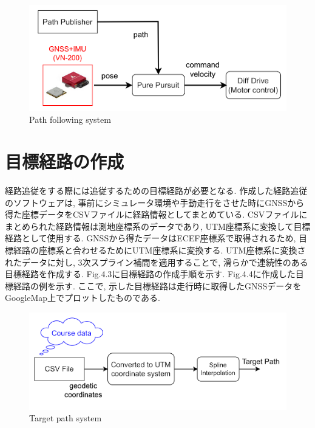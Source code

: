 \begin{figure}[H]
     \centering
    \includegraphics[keepaspectratio, scale=0.6]
         {images/SimpleSystem.png}
    \caption{Path following system}
    \label{fig:system}
\end{figure}

\section{目標経路の作成}
経路追従をする際には追従するための目標経路が必要となる.
作成した経路追従のソフトウェアは, 事前にシミュレータ環境や手動走行をさせた時にGNSSから得た座標データをCSVファイルに経路情報としてまとめている.
% 
CSVファイルにまとめられた経路情報は測地座標系のデータであり, UTM座標系に変換して目標経路として使用する.
GNSSから得たデータはECEF座標系で取得されるため, 目標経路の座標系と合わせるためにUTM座標系に変換する.
% 
UTM座標系に変換されたデータに対し, 3次スプライン補間を適用することで, 滑らかで連続性のある目標経路を作成する.
% 
% 
Fig.4.3に目標経路の作成手順を示す.
Fig.4.4に作成した目標経路の例を示す.
ここで, 示した目標経路は走行時に取得したGNSSデータをGoogleMap上でプロットしたものである.

\begin{figure}[H]
     \centering
    \includegraphics[keepaspectratio, scale=0.6]
         {images/navigationData.png}
    \caption{Target path system}
    \label{fig:target path}
\end{figure}

